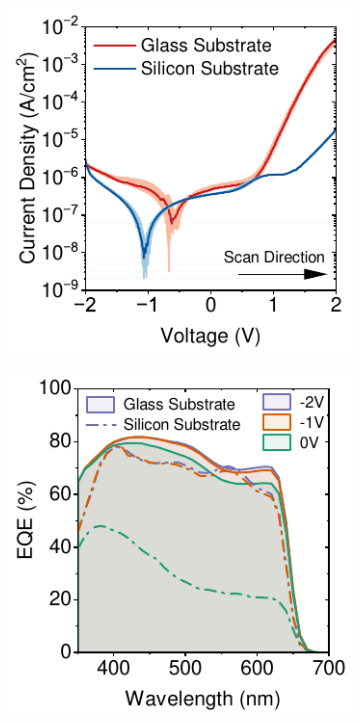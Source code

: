 \begin{figure}[htbp]
    \centering
    \begin{subfigure}{0.32\textwidth}
        \centering
        \includegraphics[width=\textwidth]{chapters/material_properties/images/JV_PIX_Glass.pdf}
        \caption{}
        \label{fig:ch2:jv_comp_pic_glass}
    \end{subfigure}
    \hfill
    \begin{subfigure}{0.32\textwidth}
        \centering
        \includegraphics[width=\textwidth]{chapters/material_properties/images/EQE_fnm_PIX_Glass.pdf}

\end{subfigure}
\end{figure}
